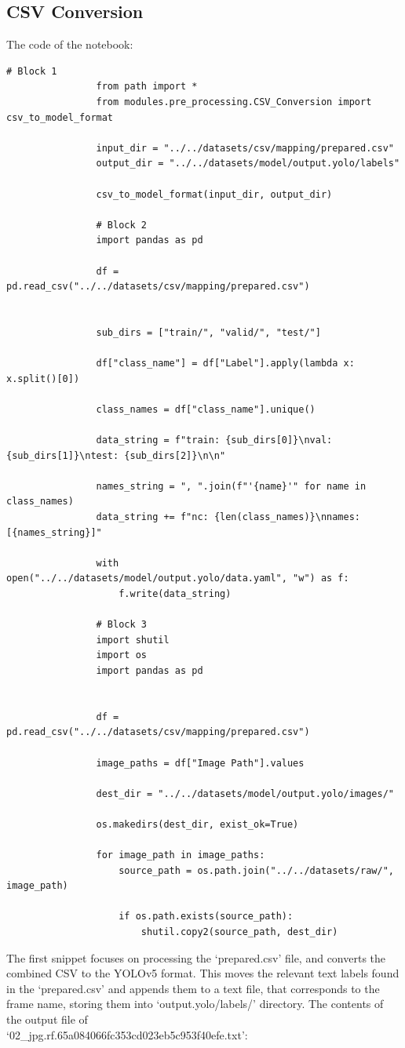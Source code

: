 \documentclass[12pt]{report} %
\begin{document}
		\subsection*{CSV Conversion}
			The code of the notebook:
			\begin{lstlisting}[tabsize=1]
				# Block 1
				from path import *
				from modules.pre_processing.CSV_Conversion import csv_to_model_format

				input_dir = "../../datasets/csv/mapping/prepared.csv"
				output_dir = "../../datasets/model/output.yolo/labels"

				csv_to_model_format(input_dir, output_dir)

				# Block 2
				import pandas as pd

				df = pd.read_csv("../../datasets/csv/mapping/prepared.csv")


				sub_dirs = ["train/", "valid/", "test/"]

				df["class_name"] = df["Label"].apply(lambda x: x.split()[0])

				class_names = df["class_name"].unique()

				data_string = f"train: {sub_dirs[0]}\nval: {sub_dirs[1]}\ntest: {sub_dirs[2]}\n\n"

				names_string = ", ".join(f"'{name}'" for name in class_names)
				data_string += f"nc: {len(class_names)}\nnames: [{names_string}]"

				with open("../../datasets/model/output.yolo/data.yaml", "w") as f:
					f.write(data_string)

				# Block 3
				import shutil
				import os
				import pandas as pd


				df = pd.read_csv("../../datasets/csv/mapping/prepared.csv")

				image_paths = df["Image Path"].values

				dest_dir = "../../datasets/model/output.yolo/images/"

				os.makedirs(dest_dir, exist_ok=True)

				for image_path in image_paths:
					source_path = os.path.join("../../datasets/raw/", image_path)

					if os.path.exists(source_path):
						shutil.copy2(source_path, dest_dir)
			\end{lstlisting}

			The first snippet focuses on processing the `prepared.csv' file, and converts the combined CSV to the YOLOv5 format. This moves the relevant text labels found in the `prepared.csv' and appends them to a text file, that corresponds to the frame name, storing them into `output.yolo/labels/' directory. The contents of the output file of\\`02\_jpg.rf.65a084066fc353cd023eb5c953f40efe.txt':
\end{document}
